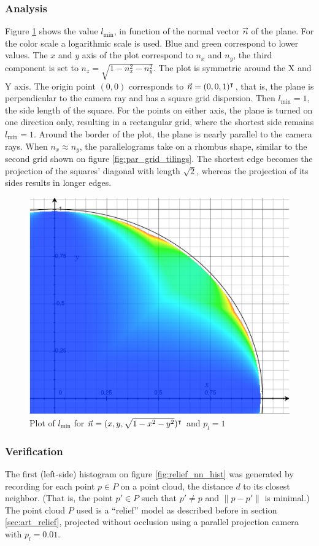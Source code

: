 \subsubsection{Analysis}
Figure \ref{fig:lmin_plot} shows the value $l_{\text{min}}$, in function of the normal vector $\vec{n}$ of the plane. For the color scale a logarithmic scale is used. Blue and green correspond to lower values. The $x$ and $y$ axis of the plot correspond to $n_x$ and $n_y$, the third component is set to $n_z = \sqrt{1 - n^2_x - n^2_y}$. The plot is symmetric around the X and Y axis. The origin point $(0, 0)$ corresponds to $\vec{n} = (0, 0, 1)^\intercal$, that is, the plane is perpendicular to the camera ray and has a square grid dispersion. Then $l_{\text{min}} = 1$, the side length of the square. For the points on either axis, the plane is turned on one direction only, resulting in a rectangular grid, where the shortest side remains $l_{\text{min}} = 1$. Around the border of the plot, the plane is nearly parallel to the camera rays. When $n_x \approx n_y$, the parallelograms take on a rhombus shape, similar to the second grid shown on figure \ref{fig:par_grid_tilings}. The shortest edge becomes the projection of the squares' diagonal with length $\sqrt{2}$, whereas the projection of its sides results in longer edges.

\begin{figure}[p]
\centering
\includegraphics[width=.4\textwidth]{fig/lmin_plot.pdf}
\caption{Plot of $l_{\text{min}}$ for $\vec{n} = (x, y, \sqrt{1 - x^2 - y^2})^\intercal$ and $p_l = 1$}
\label{fig:lmin_plot}
\end{figure}


\subsubsection{Verification}
The first (left-side) histogram on figure \ref{fig:relief_nn_hist} was generated by recording for each point $p \in P$ on a point cloud, the distance $d$ to its closest neighbor. (That is, the point $p' \in P$ such that $p' \neq p$ and $\| p - p' \|$ is minimal.) The point cloud $P$ used is a ``relief'' model as described before in section \ref{sec:art_relief}, projected without occlusion using a parallel projection camera with $p_l = 0.01$.

